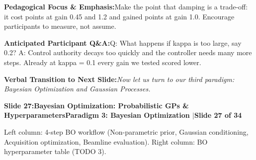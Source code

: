 \documentclass[11pt,a4paper]{article}
\begin{document}
\begin{tcolorbox}[colback=lightbg,colframe=bordergray,left=6pt,right=6pt,top=3pt,bottom=3pt,boxrule=0.6pt,arc=2.5pt]
\small
\noindent\textbf{\color{navy}Pedagogical Focus \& Emphasis:}\enspace Make the point that damping is a trade-off: it cost points at gain 0.45 and 1.2 and gained points at gain 1.0. Encourage participants to measure, not assume.\par\vspace{0.3em}
\noindent\textbf{\color{successgreen}Anticipated Participant Q\&A:}\enspace Q: What happens if kappa is too large, say 0.2? A: Control authority decays too quickly and the controller needs many more steps. Already at kappa = 0.1 every gain we tested scored lower.\par\vspace{0.3em}
\noindent\textbf{\color{accent}Verbal Transition to Next Slide:}\enspace \emph{Now let us turn to our third paradigm: Bayesian Optimization and Gaussian Processes.}
\end{tcolorbox}
\clearpage
\hypertarget{slide.27}{}
{}
\noindent\begin{tcolorbox}[colback=navy,colframe=navy,left=6pt,right=6pt,top=3pt,bottom=3pt,boxrule=0pt,arc=2pt]
{\large\bfseries\color{white}Slide 27:\enspace Bayesian Optimization: Probabilistic GPs \& Hyperparameters}\hfill{\footnotesize\bfseries\color{white!85!lightbg}Paradigm 3: Bayesian Optimization \enspace$|$\enspace Slide 27 of 34}
\end{tcolorbox}
\vspace{0.2em}
\begin{tcolorbox}[colback=lightbg,colframe=bordergray,title={\footnotesize\bfseries\color{darkgray}Slide Visual Blueprint},fontupper=\small,left=6pt,right=6pt,top=2.5pt,bottom=2.5pt,boxrule=0.6pt,arc=2.5pt]
Left column: 4-step BO workflow (Non-parametric prior, Gaussian conditioning, Acquisition optimization, Beamline evaluation). Right column: BO hyperparameter table (TODO 3).
\end{tcolorbox}
\vspace{0.2em}
\end{document}
